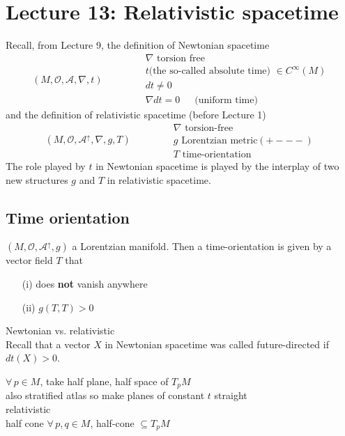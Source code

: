 \section{Lecture 13: Relativistic spacetime}

Recall, from Lecture 9, the definition of Newtonian spacetime
\[
(M, \mathcal{O}, \mathcal{A}, \nabla, t) \quad \quad \quad \, \begin{aligned}
& \nabla \text{ torsion free } \\
& t \text{(the so-called absolute time) } \in C^{\infty}(M) \\ 
& dt \neq 0 \\
& \nabla dt = 0   \quad \, \text{ (uniform time) }
\end{aligned}
\]
and the definition of relativistic spacetime (before Lecture 1)
\[
(M, \mathcal{O}, \mathcal{A}^{\uparrow}, \nabla, g, T ) \quad \quad \quad \, \begin{aligned}
& \nabla \text{ torsion-free } \\
& g \text{ Lorentzian metric} (+---) \\ 
& T \text{ time-orientation }
\end{aligned}
\]
The role played by $t$ in Newtonian spacetime is played by the interplay of two new structures $g$ and $T$ in relativistic spacetime.

\subsection{Time orientation}

\begin{definition}
  $(M,\mathcal{O},\mathcal{A}^{\uparrow},g)$ a Lorentzian manifold.  Then a time-orientation is given by a vector field $T$ that 
\begin{enumerate}
\item[(i)] does \textbf{not} vanish anywhere 
\item[(ii)] $g(T,T)>0$
\end{enumerate}
\end{definition}

Newtonian vs. relativistic \\
Recall that a vector $X$ in Newtonian spacetime was called future-directed if $dt(X) > 0$.

$\forall \, p \in M$, take half plane, half space of $T_pM$ \\
also stratified atlas so make planes of constant $t$ straight \\
relativistic \\
half cone $\forall \, p, q \in M$, half-cone $\subseteq T_pM$ \\

